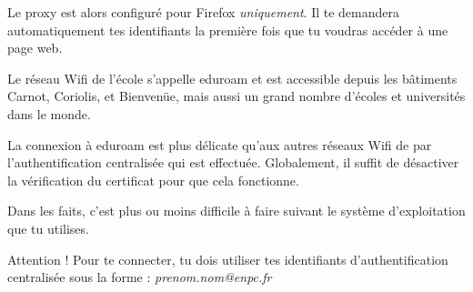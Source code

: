 \documentclass{../templates/enpc-ki/ki020}
\begin{document}
        Le proxy est alors configuré pour Firefox \emph{uniquement}. Il te demandera automatiquement tes identifiants la première fois que tu voudras accéder à une page web.





    \vspace{2cm}
    Le réseau Wifi de l’école s’appelle eduroam et est accessible depuis les bâtiments Carnot, Coriolis, et Bienvenüe, mais aussi un grand nombre d'écoles et universités dans le monde.

    La connexion à eduroam est plus délicate qu’aux autres réseaux Wifi de par l'authentification centralisée qui est effectuée. Globalement, il suffit de désactiver la vérification du certificat pour que cela fonctionne.

    Dans les faits, c’est plus ou moins difficile à faire suivant le système d’exploitation que tu utilises.

    Attention ! Pour te connecter, tu dois utiliser tes identifiants d’authentification centralisée sous la forme : \emph{prenom.nom@enpc.fr}

\newpage
\end{document}

